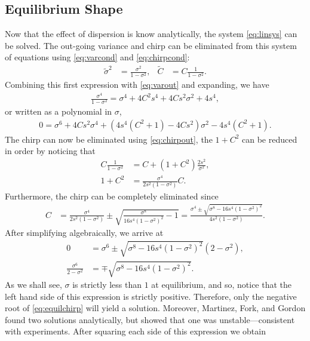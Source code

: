 \subsection{Equilibrium Shape}
Now that the effect of dispersion is know analytically, the system \eqref{eq:linsys} can be solved. The out-going variance and chirp can be eliminated from this system of equations using \eqref{eq:varcond} and \eqref{eq:chirpcond}:
\begin{align*}
\widetilde{\sigma}^2 &= \frac{\sigma^2}{1 - \sigma^2}, & \widetilde{C} &= C \frac{1}{1 - \sigma^2}.
\end{align*}
Combining this first expression with \eqref{eq:varout} and expanding, we have
\begin{align*}
\frac{\sigma^4}{1 - \sigma^2} = \sigma^4 + 4 C^2 s^4 + 4 C s^2 \sigma^2 + 4s^4,
\end{align*}
or written as a polynomial in $\sigma$,
\begin{align*}
0 = \sigma^6 + 4 C s^2 \sigma^4 + \left( 4s^4 (C^2 + 1) - 4 C s^2 \right) \sigma^2 - 4s^4 (C^2 + 1).
\end{align*}
The chirp can now be eliminated using \eqref{eq:chirpout}, the $1+C^2$ can be reduced in order by noticing that
\begin{align*}
C \frac{1}{1 - \sigma^2} &= C + (1 + C^2) \frac{2s^2}{\sigma^2}, \\
1 + C^2 &= \frac{\sigma^4}{2s^2(1 - \sigma^2)} C.
\end{align*}
Furthermore, the chirp can be completely eliminated since
\begin{align}
\label{eq:equilchirp}
C &= \frac{\sigma^4}{2s^2(1 - \sigma^2)} \pm \sqrt{\frac{\sigma^8}{16s^4(1 - \sigma^2)^2} - 1} = \frac{\sigma^4 \pm \sqrt{\sigma^8 - 16s^4(1 - \sigma^2)^2}}{4s^2(1 - \sigma^2)}.
\end{align}
After simplifying algebraically, we arrive at
\begin{align*}
0 &= \sigma^6 \pm \sqrt{\sigma^8 - 16s^4(1 - \sigma^2)^2}(2 - \sigma^2), \\
\frac{\sigma^6}{2 - \sigma^2} &= \mp \sqrt{\sigma^8 - 16s^4(1 - \sigma^2)^2}.
\end{align*}
As we shall see, $\sigma$ is strictly less than $1$ at equilibrium, and so, notice that the left hand side of this expression is strictly positive. Therefore, only the negative root of \eqref{eq:equilchirp} will yield a solution. Moreover, Martinez, Fork, and Gordon \cite{martinez1984} found two solutions analytically, but showed that one was unstable---consistent with experiments. After squaring each side of this expression we obtain
